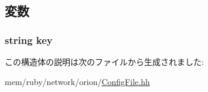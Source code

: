 \subsection{変数}
\hypertarget{structConfigFile_1_1key__not__found_aa8fa75d45876bcbe59f33f49e7d3572d}{
\subsubsection[{key}]{\setlength{\rightskip}{0pt plus 5cm}string {\bf key}}}
\label{structConfigFile_1_1key__not__found_aa8fa75d45876bcbe59f33f49e7d3572d}


この構造体の説明は次のファイルから生成されました:\begin{DoxyCompactItemize}
\item 
mem/ruby/network/orion/\hyperlink{ConfigFile_8hh}{ConfigFile.hh}\end{DoxyCompactItemize}
